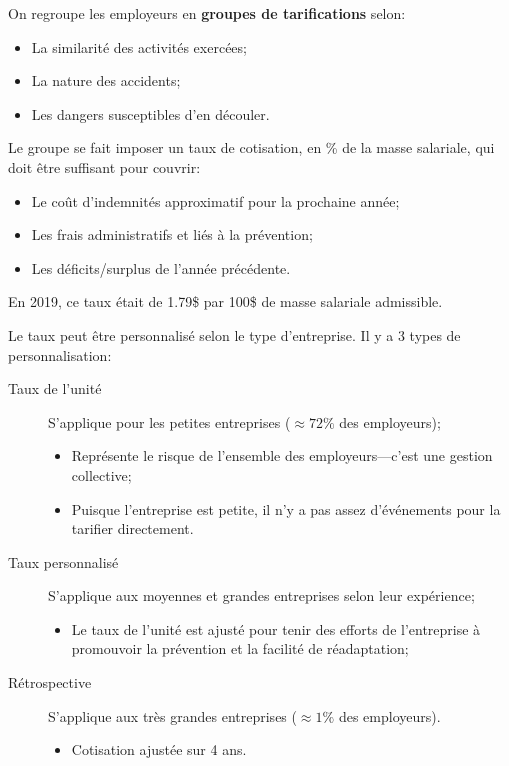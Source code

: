 \documentclass[10pt, french]{article}
\begin{document}
\begin{multicols*}{3}
On regroupe les employeurs en \textbf{groupes de tarifications} selon: 
\begin{itemize}[leftmargin = *]
	\item	La similarité des activités exercées;
	\item	La nature des accidents;
	\item	Les dangers susceptibles d'en découler.
\end{itemize}

Le groupe se fait imposer un taux de cotisation, en \% de la masse salariale, qui doit être suffisant pour couvrir:
\begin{itemize}[leftmargin = *]
	\item	Le coût d'indemnités approximatif pour la prochaine année;
	\item	Les frais administratifs et liés à la prévention;
	\item	Les déficits/surplus de l'année précédente.
\end{itemize}

En 2019, ce taux était de 1.79\$ par 100\$ de masse salariale admissible.

Le taux peut être personnalisé selon le type d'entreprise. Il y a 3 types de personnalisation:
\begin{description}
	\item[Taux de l'unité]	S'applique pour les petites entreprises ($\approx 72\%$ des employeurs);
		\begin{itemize}[leftmargin = *]
		\item	Représente le risque de l'ensemble des employeurs---c'est une gestion collective;
		\item	Puisque l'entreprise est petite, il n'y a pas assez d'événements pour la tarifier directement.
		\end{itemize}
	\item[Taux personnalisé]	S'applique aux moyennes et grandes entreprises selon leur expérience;
		\begin{itemize}[leftmargin = *]
		\item	Le taux de l'unité est ajusté pour tenir des efforts de l'entreprise à promouvoir la prévention et la facilité de réadaptation;
		\end{itemize}
	\item[Rétrospective]	S'applique aux très grandes entreprises ($\approx 1\%$ des employeurs).
		\begin{itemize}[leftmargin = *]
		\item	Cotisation ajustée sur 4 ans.
		\end{itemize}
\end{description}


\end{multicols*}
\end{document}
